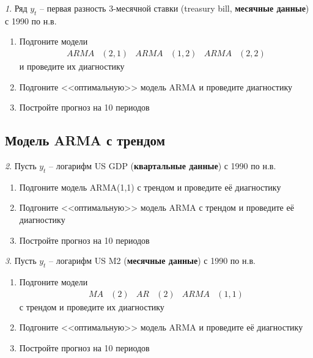 \documentclass[12pt]{article}
\theoremstyle{remark}
\newtheorem{exercise}{}[subsection]
\begin{document}
\begin{exercise}
Ряд \(y_t\) -- первая разность 3-месячной ставки (treasury bill, 
\textbf{месячные данные}) с 1990 по н.в.
\begin{enumerate}
	\item Подгоните модели
	\begin{align*}
		ARMA&(2,1) & ARMA&(1,2) & ARMA&(2,2)
	\end{align*} 
	и проведите их диагностику
	\item Подгоните <<оптимальную>> модель ARMA и проведите диагностику
	\item Постройте прогноз на 10 периодов
\end{enumerate}
\end{exercise}

\subsection{Модель ARMA с трендом}

\begin{exercise}
Пусть \(y_t\) -- логарифм US GDP (\textbf{квартальные данные}) с 1990 по н.в.
\begin{enumerate}
	\item Подгоните модель ARMA(1,1) с трендом и проведите её диагностику
	\item Подгоните <<оптимальную>> модель ARMA с трендом и проведите её диагностику
	\item Постройте прогноз на 10 периодов
\end{enumerate}
\end{exercise}

\begin{exercise}
Пусть \(y_t\) -- логарифм US M2 (\textbf{месячные данные}) с 1990 по н.в.
\begin{enumerate}
\item Подгоните модели 
	\begin{align*}
		MA&(2) & AR&(2) & ARMA&(1,1) 
	\end{align*} 
	с трендом и проведите их диагностику
	\item Подгоните <<оптимальную>> модель ARMA и проведите её диагностику
	\item Постройте прогноз на 10 периодов
\end{enumerate}
\end{exercise}
\end{document}
